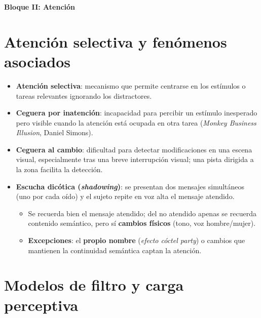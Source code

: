 \documentclass[11pt,a4paper]{article}
\begin{document}
\newpage
\begin{tcolorbox}[
  colback=Primary,
  colframe=Primary,
  arc=4pt,
  left=14pt, right=14pt, top=10pt, bottom=10pt,
  boxrule=0pt
]
  {\color{white}\LARGE\bfseries Bloque II: Atención}
\end{tcolorbox}
\setcounter{section}{0}

\section{Atención selectiva y fenómenos asociados}

\begin{itemize}
  \item \textbf{Atención selectiva}: mecanismo que permite centrarse en los estímulos o tareas relevantes ignorando los distractores.
  \item \textbf{Ceguera por inatención}: incapacidad para percibir un estímulo inesperado pero visible cuando la atención está ocupada en otra tarea (\textit{Monkey Business Illusion}, Daniel Simons).
  \item \textbf{Ceguera al cambio}: dificultad para detectar modificaciones en una escena visual, especialmente tras una breve interrupción visual; una pista dirigida a la zona facilita la detección.
  \item \textbf{Escucha dicótica (\textit{shadowing})}: se presentan dos mensajes simultáneos (uno por cada oído) y el sujeto repite en voz alta el mensaje atendido.
  \begin{itemize}
    \item Se recuerda bien el mensaje atendido; del no atendido apenas se recuerda contenido semántico, pero sí \textbf{cambios físicos} (tono, voz hombre/mujer).
    \item \textbf{Excepciones}: el \textbf{propio nombre} (\textit{efecto cóctel party}) o cambios que mantienen la continuidad semántica captan la atención.
  \end{itemize}
\end{itemize}

\section{Modelos de filtro y carga perceptiva}
\end{document}
